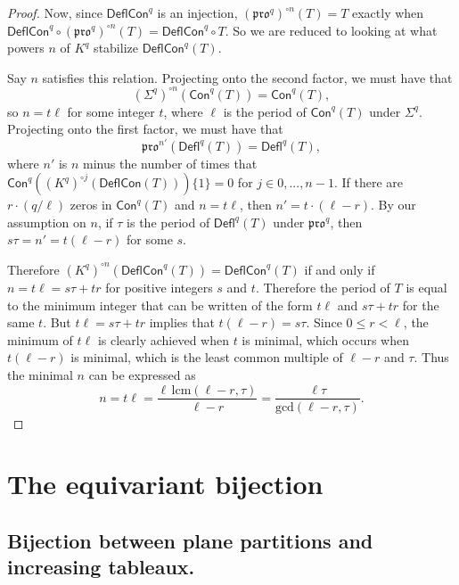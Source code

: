 \documentclass[12pt]{amsart}
\theoremstyle{definition}
\theoremstyle{remark}
\numberwithin{equation}{section}
\newcommand{\pro}{\mathfrak{pro}}
\newcommand{\deflate}{\ensuremath{\mathsf{Defl}}}
\newcommand{\content}{\ensuremath{\mathsf{Con}}}
\newcommand{\compress}{\ensuremath{\mathsf{DeflCon}}}
\begin{document}
\begin{proof}
Now, since $\compress^q$ is an injection, $(\pro^q)^{\circ n}(T) = T$ exactly when $\compress^q \circ (\pro^q)^{\circ n}(T) = \compress^q \circ T$. So we are reduced to looking at what powers $n$ of $K^q$ stabilize $\compress^q(T)$.
 

 
Say $n$ satisfies this relation. Projecting onto the second factor, we must have that \[ (\Sigma^q)^{\circ n}(\content^q(T)) = \content^q(T), \] so $n = t \ell$ for some integer $t$, where $\ell$ is the period of $\content^q(T)$ under $\Sigma^q$.  Projecting onto the first factor, we must have that  \[ \pro^{n'}(\deflate^q(T)) = \deflate^q(T), \] where $n'$ is $n$ minus the number of times that $\content^q((K^q)^{\circ j}(\compress(T))) \lbrace 1 \rbrace = 0$ for $j \in 0,...,n-1$. If there are $r \cdot (q/\ell)$ zeros in $\content^q(T)$ and $n = t \ell$, then $n' = t \cdot(\ell - r)$. By our assumption on $n$, if $\tau$ is the period of $\deflate^q(T)$ under $\pro^q$, then $s \tau = n' = t(\ell - r)$ for some $s$.

Therefore $(K^q)^{\circ n} (\compress^q(T)) = \compress^q(T)$ if and only if $n = t \ell = s \tau + t  r$ for positive integers $s$ and $t$. Therefore the period of $T$ is equal to the minimum integer that can be written of the form $t \ell$ and $s \tau + t r$ for the same $t$. But $t \ell = s\tau + tr$ implies that $t(\ell-r) = s\tau$. Since $0 \leq r < \ell$, the minimum of $t \ell$ is clearly achieved when $t$ is minimal, which occurs when $t(\ell-r)$ is minimal, which is the least common multiple of $\ell-r$ and $\tau$. Thus the minimal $n$ can be expressed as 
\begin{equation}\label{eq:period}
n = t \ell = \frac{\ell \, \text{lcm}(\ell-r,\tau)}{\ell-r} = \frac{\ell \tau}{\text{gcd}(\ell-r,\tau)}. 
\end{equation}
\end{proof}

\section{The equivariant bijection}\label{sec:equivariant}
\subsection{Bijection between plane partitions and increasing tableaux.} 
\end{document}

